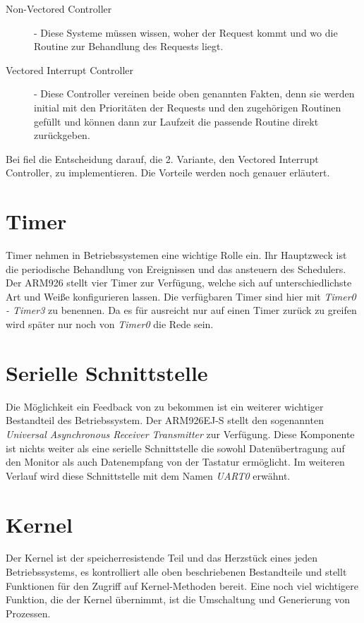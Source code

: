\begin{description}
	\item[Non-Vectored Controller] - Diese Systeme m\"ussen wissen, woher der Request kommt und wo die Routine zur Behandlung des Requests liegt.
	\item[Vectored Interrupt Controller] - Diese Controller vereinen beide oben genannten Fakten, denn sie werden initial mit den Priorit\"aten der Requests und den zugeh\"origen Routinen gef\"ullt und k\"onnen dann zur Laufzeit die passende Routine direkt zur\"uckgeben.
\end{description}
Bei \mops fiel die Entscheidung darauf, die 2. Variante, den Vectored Interrupt Controller, zu implementieren. Die Vorteile werden noch genauer erl\"autert.
\section{Timer}
Timer nehmen in Betriebssystemen eine wichtige Rolle ein. Ihr Hauptzweck ist die periodische Behandlung von Ereignissen und das ansteuern des Schedulers. \\
Der ARM926 stellt vier Timer zur Verf\"ugung, welche sich auf unterschiedlichste Art und Wei\ss e konfigurieren lassen. Die verf\"ugbaren Timer sind hier mit \textit{Timer0 - Timer3} zu benennen\parencite[vgl.][262]{archManI}. Da es f\"ur \mops ausreicht nur auf einen Timer zur\"uck zu greifen wird sp\"ater nur noch von \textit{Timer0} die Rede sein.
\section{Serielle Schnittstelle}
Die M\"oglichkeit ein Feedback von \mops zu bekommen ist ein weiterer wichtiger Bestandteil des Betriebssystem. Der ARM926EJ-S stellt den sogenannten \textit{Universal Asynchronous Receiver Transmitter} zur Verf\"ugung. Diese Komponente ist nichts weiter als eine serielle Schnittstelle die sowohl Daten\"ubertragung auf den Monitor als auch Datenempfang von der Tastatur erm\"oglicht. Im weiteren Verlauf wird diese Schnittstelle mit dem Namen \textit{UART0} erw\"ahnt.
\section{Kernel}
Der Kernel ist der speicherresistende Teil und das Herzst\"uck eines jeden Betriebssystems, es kontrolliert alle oben beschriebenen Bestandteile und stellt Funktionen f\"ur den Zugriff auf Kernel-Methoden bereit. Eine noch viel wichtigere Funktion, die der Kernel \"ubernimmt, ist die Umschaltung und Generierung von Prozessen. 


